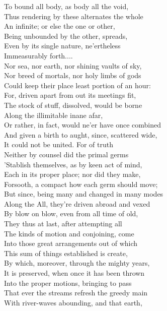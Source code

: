 To bound all body, as body all the void,\\
Thus rendering by these alternates the whole\\
An infinite; or else the one or other,\\
Being unbounded by the other, spreads,\\
Even by its single nature, ne'ertheless\\
Immeasurably forth....\\
Nor sea, nor earth, nor shining vaults of sky,\\
Nor breed of mortals, nor holy limbs of gods\\
Could keep their place least portion of an hour:\\
For, driven apart from out its meetings fit,\\
The stock of stuff, dissolved, would be borne\\
Along the illimitable inane afar,\\
Or rather, in fact, would ne'er have once combined\\
And given a birth to aught, since, scattered wide,\\
It could not be united. For of truth\\
Neither by counsel did the primal germs\\
'Stablish themselves, as by keen act of mind,\\
Each in its proper place; nor did they make,\\
Forsooth, a compact how each germ should move;\\
But since, being many and changed in many modes\\
Along the All, they're driven abroad and vexed\\
By blow on blow, even from all time of old,\\
They thus at last, after attempting all\\
The kinds of motion and conjoining, come\\
Into those great arrangements out of which\\
This sum of things established is create,\\
By which, moreover, through the mighty years,\\
It is preserved, when once it has been thrown\\
Into the proper motions, bringing to pass\\
That ever the streams refresh the greedy main\\
With river-waves abounding, and that earth,\\
